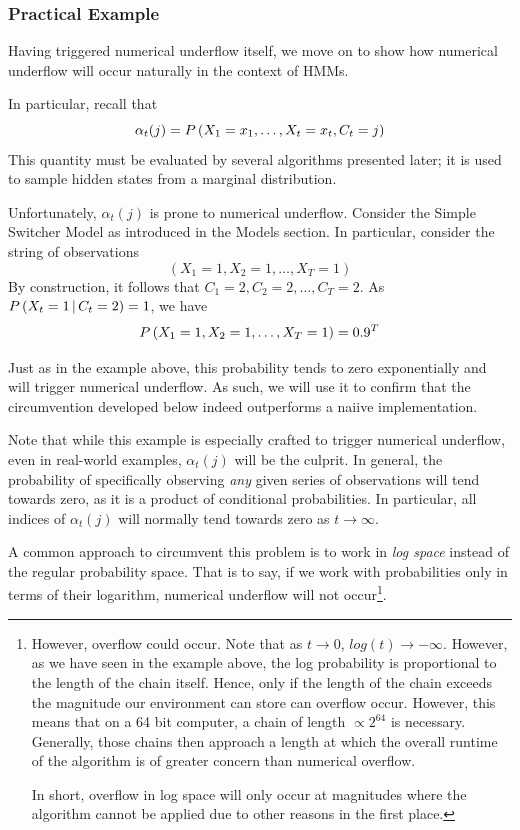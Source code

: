 \subsubsection{Practical Example}
Having triggered numerical underflow itself, we move on to show how numerical underflow will occur naturally in the context of HMMs. 

In particular, recall that 
\[
	\alpha_t(j) = P \left(X_1 = x_1, \dots, X_t = x_t, C_t = j\right)
\]
This quantity must be evaluated by several algorithms presented later; it is used to sample hidden states from a marginal distribution. 

Unfortunately, $\alpha_t(j)$ is prone to numerical underflow. Consider the Simple Switcher Model as introduced in the Models section. In particular, consider the string of observations 
\[
	\left( X_1 = 1, X_2 = 1, \dots, X_T = 1 \right)
\]
By construction, it follows that $C_1 = 2, C_2 = 2, \dots, C_T = 2$. As $P\left(X_t = 1 \, | \, C_t = 2\right) = 1$, we have
\[
	P \left(X_1 = 1, X_2 = 1, \dots, X_T = 1\right) = 0.9^T
\]

Just as in the example above, this probability tends to zero exponentially and will trigger numerical underflow. As such, we will use it to confirm that the circumvention developed below indeed outperforms a naiive implementation. 

Note that while this example is especially crafted to trigger numerical underflow, even in real-world examples, $\alpha_t(j)$ will be the culprit.
 In general, the probability of specifically observing \textit{any} given series of observations will tend towards zero, as it is a product of conditional probabilities. In particular, all indices of $\alpha_t(j)$ will normally tend towards zero as $t \rightarrow \infty$.
 
 A common approach to circumvent this problem is to work in \textit{log space} instead of the regular probability space. That is to say, if we work with probabilities only in terms of their logarithm, numerical underflow will not occur\footnote{However, overflow could occur. Note that as $t \longrightarrow 0$, $log(t) \longrightarrow -\infty$. However, as we have seen in the example above, the log probability is proportional to the length of the chain itself. Hence, only if the length of the chain exceeds the magnitude our environment can store can overflow occur. However, this means that on a 64 bit computer, a chain of length $\propto 2^{64}$ is necessary. Generally, those chains then approach a length at which the overall runtime of the algorithm is of greater concern than numerical overflow. 
 	
 	In short, overflow in log space will only occur at magnitudes where the algorithm cannot be applied due to other reasons in the first place. }. 


